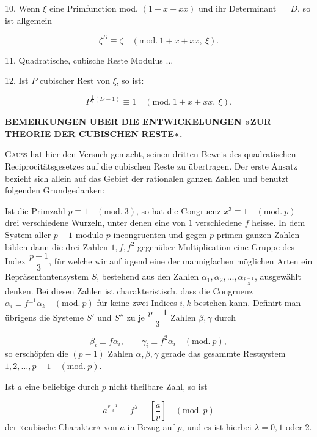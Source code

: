 10. Wenn $\xi$ eine Primfunction mod. $(1+x+xx)$ und ihr Determinant $=D$,
so ist allgemein

\[
\zeta^D \equiv \zeta \quad(\mathrm{mod.}\ 1+x+xx,\ \xi).
\]

11. Quadratische, cubische Reste Modulus $\ldots$

12. Ist $P$ cubischer Rest von $\xi$, so ist:

\[
P^{\frac{1}{3}(D-1)} \equiv 1 \quad(\mathrm{mod.}\ 1+x+xx,\ \xi).
\]



\begingroup\small
\begin{center}
\textbf{BEMERKUNGEN UBER DIE ENTWICKELUNGEN »ZUR THEORIE DER CUBISCHEN} 
\textbf{RESTE«.}
\end{center}
\noindent\hspace*{\parindent}\textsc{Gauss} hat hier den Versuch gemacht, seinen dritten Beweis des
quadratischen Reciprocitätsgesetzes auf die cubischen Reste zu
übertragen. Der erste Ansatz bezieht sich allein auf das Gebiet der
rationalen ganzen Zahlen und benutzt folgenden Grundgedanken:

Ist die Primzahl $p \equiv 1 \quad(\mathrm{mod.}\ 3)$, so hat die Congruenz $x^3 \equiv 1
\quad(\mathrm{mod.}\ p)$ drei verschiedene Wurzeln, unter denen eine von $1$ verschiedene
$f$ heisse. In dem System aller $p-1$ modulo $p$ incongruenten und gegen
$p$ primen ganzen Zahlen bilden dann die drei Zahlen $1, f, f^2$
gegenüber Multiplication eine Gruppe des Index $\dfrac{p-1}{3}$, für
welche wir auf irgend eine der mannigfachen möglichen Arten ein
Repräsentantensystem $S$, bestehend aus den Zahlen $\alpha_1, \alpha_2,
\ldots, \alpha_{\frac{p-1}{3}}$, ausgewählt denken. Bei diesen Zahlen ist
charakteristisch, dass die Congruenz $\alpha_i \equiv f^{\pm1}\alpha_k
\quad(\mathrm{mod.}\ p)$ für keine zwei Indices $i, k$ bestehen kann. Definirt man
übrigens die Systeme $S'$ und $S''$ zu je $\dfrac{p-1}{3}$ Zahlen
$\beta, \gamma$ durch

\[
\beta_i \equiv f\alpha_i, \qquad \gamma_i \equiv f^2\alpha_i \quad(\mathrm{mod.}\ p),
\]
\noindent so erschöpfen die $(p-1)$ Zahlen $\alpha, \beta, \gamma$ gerade das
gesammte Restsystem\hfill\\
$1, 2, \ldots, {p-1} \quad(\mathrm{mod.}\ p)$.

Ist $a$ eine beliebige durch $p$ nicht theilbare Zahl, so ist

\[
a^{\frac{p-1}{3}} \equiv f^{\lambda} \equiv \left[\frac{a}{p}\right] \quad(\mathrm{mod.}\ p)
\]
\noindent der »cubische Charakter« von $a$ in Bezug auf $p$, und es ist hierbei
$\lambda = 0, 1$ oder $2$.

